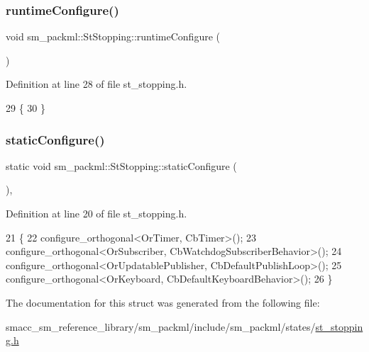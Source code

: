 \subsubsection{\texorpdfstring{runtime\+Configure()}{runtimeConfigure()}}
{\footnotesize\ttfamily void sm\+\_\+packml\+::\+St\+Stopping\+::runtime\+Configure (\begin{DoxyParamCaption}{ }\end{DoxyParamCaption})\hspace{0.3cm}{\ttfamily [inline]}}



Definition at line 28 of file st\+\_\+stopping.\+h.


\begin{DoxyCode}
29     \{
30     \}
\end{DoxyCode}
\mbox{\label{structsm__packml_1_1StStopping_aad0f6b6783a0f883b8fc71c01bfb4ab1}} 
\subsubsection{\texorpdfstring{static\+Configure()}{staticConfigure()}}
{\footnotesize\ttfamily static void sm\+\_\+packml\+::\+St\+Stopping\+::static\+Configure (\begin{DoxyParamCaption}{ }\end{DoxyParamCaption})\hspace{0.3cm}{\ttfamily [inline]}, {\ttfamily [static]}}



Definition at line 20 of file st\+\_\+stopping.\+h.


\begin{DoxyCode}
21     \{
22         configure\_orthogonal<OrTimer, CbTimer>();   
23         configure\_orthogonal<OrSubscriber, CbWatchdogSubscriberBehavior>();
24         configure\_orthogonal<OrUpdatablePublisher, CbDefaultPublishLoop>();
25         configure\_orthogonal<OrKeyboard, CbDefaultKeyboardBehavior>();
26     \}
\end{DoxyCode}


The documentation for this struct was generated from the following file\+:\begin{DoxyCompactItemize}
\item 
smacc\+\_\+sm\+\_\+reference\+\_\+library/sm\+\_\+packml/include/sm\+\_\+packml/states/\hyperlink{st__stopping_8h}{st\+\_\+stopping.\+h}\end{DoxyCompactItemize}
